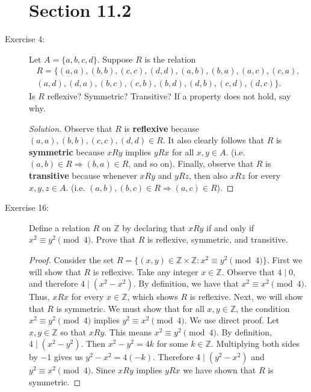 \documentclass[12pt]{article}
\begin{document}
\begin{description}
\section*{Section 11.2}
\item[Exercise 4:] Let $A = \{a,b,c,d\}$. Suppose $R$ is the relation
\begin{align*}
    R = \{(a,a),(b,b),(c,c),(d,d),(a,b),(b,a),(a,c),(c,a), \\
(a,d),(d,a),(b, c),(c,b),(b,d),(d,b),(c,d),(d, c)\}.
\end{align*}
Is $R$ reflexive? Symmetric? Transitive? If a property does not hold, say why.
\begin{spacing}{2}
\begin{proof}[Solution]
Observe that $R$ is \textbf{reflexive} because $(a,a),(b,b),(c,c),(d,d) \in R$. It also clearly follows that $R$ is \textbf{symmetric} because  $xRy$ implies $yRx$ for all $x,y \in A$. (i.e. $(a,b) \in R \Rightarrow (b,a) \in R$, and so on). Finally, observe that $R$ is \textbf{transitive} because whenever $xRy$ and $yRz$, then also $xRz$ for every $x,y,z \in A$. (i.e. $(a,b),(b,c) \in R \Rightarrow (a,c) \in R$).
\end{proof}
\end{spacing} 
\item[Exercise 16:] Define a relation $R$ on $\mathbb{Z}$ by declaring that $xRy$ if and only if $x^2 \equiv y^2 \pmod{4}$. Prove that $R$ is reflexive, symmetric, and transitive.
\begin{spacing}{2}
\begin{proof}
Consider the set $R = \{(x,y) \in \mathbb{Z} \times \mathbb{Z}: x^2 \equiv y^2 \pmod{4}\}$.
\newline
First we will show that $R$ is reflexive. Take any integer $x \in \mathbb{Z}$. Observe that $4 \mid 0$, and therefore $4 \mid (x^2 - x^2)$. By definition, we have that $x^2 \equiv x^2 \pmod{4}$. Thus, $xRx$ for every $x \in \mathbb{Z}$, which shows $R$ is reflexive.
\newline
Next, we will show that $R$ is symmetric. We must show that for all $x,y \in \mathbb{Z}$, the condition $x^2 \equiv y^2 \pmod{4}$ implies $y^2 \equiv x^2 \pmod{4}$. We use direct proof. Let $x,y \in \mathbb{Z}$ so that $xRy$. This means $x^2 \equiv y^2 \pmod{4}$. By definition, $4 \mid (x^2 - y^2)$. Then $x^2-y^2 = 4k$ for some $k \in \mathbb{Z}$. Multiplying both sides by $-1$ gives us $y^2 - x^2 = 4(-k)$. Therefore $4 \mid (y^2 - x^2)$ and $y^2 \equiv x^2 \pmod{4}$. Since $xRy$ implies $yRx$ we have shown that $R$ is symmetric.

\end{proof}
\end{spacing}
\end{description}
\end{document}
